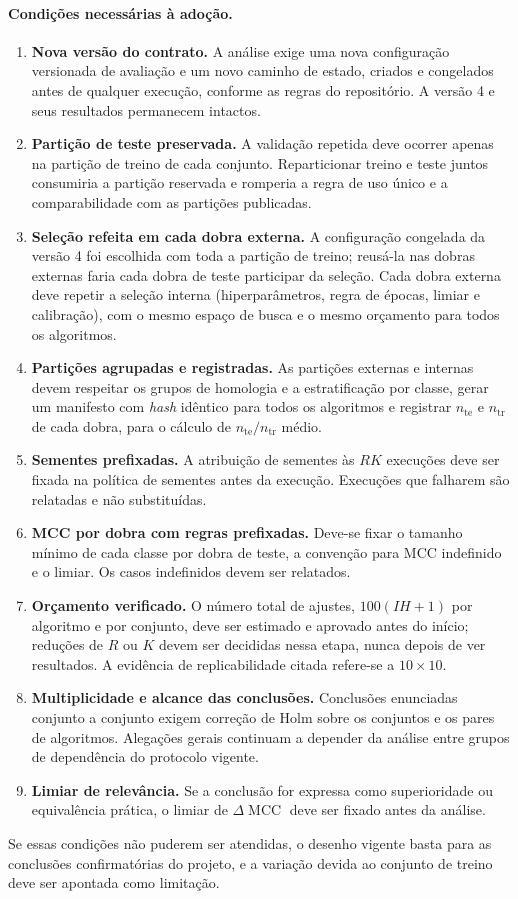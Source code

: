 \documentclass[11pt,a4paper]{article}
\newcommand{\tr}{\mathrm{tr}}
\newcommand{\te}{\mathrm{te}}
\newcommand{\MCC}{\operatorname{MCC}}
\begin{document}
\paragraph{Condições necessárias à adoção.}
\begin{enumerate}[leftmargin=*]
  \item \textbf{Nova versão do contrato.} A análise exige uma nova
    configuração versionada de avaliação e um novo caminho de estado, criados e
    congelados antes de qualquer execução, conforme as regras do repositório.
    A versão 4 e seus resultados permanecem intactos.
  \item \textbf{Partição de teste preservada.} A validação repetida deve
    ocorrer apenas na partição de treino de cada conjunto. Reparticionar treino
    e teste juntos consumiria a partição reservada e romperia a regra de uso
    único e a comparabilidade com as partições publicadas.
  \item \textbf{Seleção refeita em cada dobra externa.} A configuração
    congelada da versão 4 foi escolhida com toda a partição de treino; reusá-la
    nas dobras externas faria cada dobra de teste participar da seleção. Cada
    dobra externa deve repetir a seleção interna (hiperparâmetros, regra de
    épocas, limiar e calibração), com o mesmo espaço de busca e o mesmo
    orçamento para todos os algoritmos.
  \item \textbf{Partições agrupadas e registradas.} As partições externas e
    internas devem respeitar os grupos de homologia e a estratificação por
    classe, gerar um manifesto com \emph{hash} idêntico para todos os
    algoritmos e registrar $n_{\te}$ e $n_{\tr}$ de cada dobra, para o cálculo
    de $n_{\te}/n_{\tr}$ médio.
  \item \textbf{Sementes prefixadas.} A atribuição de sementes às $RK$
    execuções deve ser fixada na política de sementes antes da execução.
    Execuções que falharem são relatadas e não substituídas.
  \item \textbf{MCC por dobra com regras prefixadas.} Deve-se fixar o
    tamanho mínimo de cada classe por dobra de teste, a convenção para MCC
    indefinido e o limiar. Os casos indefinidos devem ser relatados.
  \item \textbf{Orçamento verificado.} O número total de ajustes,
    $100(IH+1)$ por algoritmo e por conjunto, deve ser estimado e aprovado
    antes do início; reduções de $R$ ou $K$ devem ser decididas nessa etapa,
    nunca depois de ver resultados. A evidência de replicabilidade citada
    refere-se a $10\times10$.
  \item \textbf{Multiplicidade e alcance das conclusões.} Conclusões
    enunciadas conjunto a conjunto exigem correção de Holm sobre os conjuntos e
    os pares de algoritmos. Alegações gerais continuam a depender da análise
    entre grupos de dependência do protocolo vigente.
  \item \textbf{Limiar de relevância.} Se a conclusão for expressa como
    superioridade ou equivalência prática, o limiar de $\Delta\MCC$ deve ser
    fixado antes da análise.
\end{enumerate}
Se essas condições não puderem ser atendidas, o desenho vigente basta para as
conclusões confirmatórias do projeto, e a variação devida ao conjunto de
treino deve ser apontada como limitação.

\printbibliography[title={Referências}]
\end{document}
